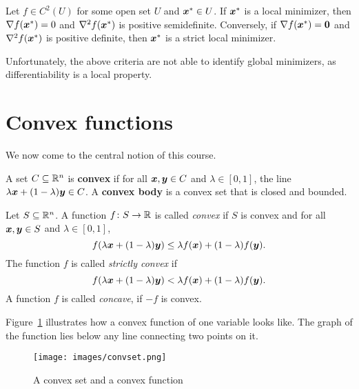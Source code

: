 \begin{theorem}
 Let $f\in C^2(U)$ for some open set $U$ and $\bm{x}^*\in U$. 
 If $\bm{x}^*$ is a local minimizer, then $\nabla f(\bm{x}^*)=0$ and $\nabla^2f(\bm{x}^*)$  is positive semidefinite. Conversely, if $\nabla f(\bm{x}^*)=\bm{0}$ and $\nabla^2f(\bm{x}^*)$ is positive definite, then $\bm{x}^*$ is a strict local minimizer. 
\end{theorem}

Unfortunately, the above criteria are not able to identify global minimizers, as differentiability is a local property.

\section{Convex functions} We now come to the central notion of this course.  

\begin{definition} A set $C\subseteq \mathbb{R}^n$ is \textbf{convex} if for all $\bm{x},\bm{y}\in C$ and $\lambda \in [0,1]$, the line $\lambda \bm{x}+(1-\lambda)\bm{y}\in C$. A \textbf{convex body} is a convex set that is closed and bounded.
\end{definition}

\begin{definition}
Let $S\subseteq \mathbb{R}^n$. 
A function $f\colon S\to \mathbb{R}$ is called {\em convex} if $S$ is convex and for all $\bm{x},\bm{y}\in S$ and $\lambda\in [0,1]$,
\begin{equation*}
 f(\lambda \bm{x}+(1-\lambda)\bm{y})\leq \lambda f(\bm{x})+(1-\lambda)f(\bm{y}).
\end{equation*}
The function $f$ is called {\em strictly convex} if
\begin{equation*}
 f(\lambda \bm{x}+(1-\lambda)\bm{y})< \lambda f(\bm{x})+(1-\lambda)f(\bm{y}).
\end{equation*}
A function $f$ is called {\em concave}, if $-f$ is convex. 
\end{definition}

Figure~\ref{fig:convfun} illustrates how a convex function of one variable looks like. The graph of the function lies below any line connecting two points on it.

\begin{figure}[h!]
\centering
 \texttt{[image: images/convset.png]}
 \caption{A convex set and a convex function}\label{fig:convfun}
\end{figure}

